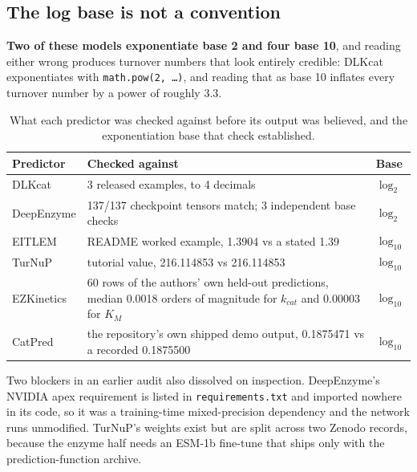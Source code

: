 \subsection{The log base is not a convention}
\label{sec:logbase}

\textbf{Two of these models exponentiate base 2 and four base 10}, and
reading either wrong produces turnover numbers that look entirely credible: DLKcat
exponentiates with \texttt{math.pow(2, \ldots)}, and reading that as base 10 inflates every
turnover number by a power of roughly 3.3.

\begin{table}[!htbp]
  \centering
  \footnotesize
  \caption[Author-example validation]{What each predictor was checked against before its
  output was believed, and the exponentiation base that check established.}
  \label{tab:validation}
  \begin{tabular}{@{}p{}p{}l@{}}
    \hline
    Predictor & Checked against & Base \\
    \hline
    DLKcat & 3 released examples, to 4 decimals & $\log_2$ \\
    DeepEnzyme & 137/137 checkpoint tensors match; 3 independent base checks & $\log_2$ \\
    EITLEM & README worked example, 1.3904 vs a stated 1.39 & $\log_{10}$ \\
    TurNuP & tutorial value, 216.114853 vs 216.114853 & $\log_{10}$ \\
    EZKinetics & 60 rows of the authors' own held-out predictions, median 0.0018 orders of magnitude
      for $k_{cat}$ and 0.00003 for $K_M$ & $\log_{10}$ \\
    CatPred & the repository's own shipped demo output, 0.1875471 vs a recorded 0.1875500
      & $\log_{10}$ \\
    \hline
  \end{tabular}
\end{table}

Two blockers in an earlier audit also dissolved on inspection. DeepEnzyme's NVIDIA apex
requirement is listed in \texttt{requirements.txt} and imported nowhere in its code, so it
was a training-time mixed-precision dependency and the network runs unmodified. TurNuP's
weights exist but are split across two Zenodo records, because the enzyme half needs an
ESM-1b fine-tune that ships only with the prediction-function archive.

